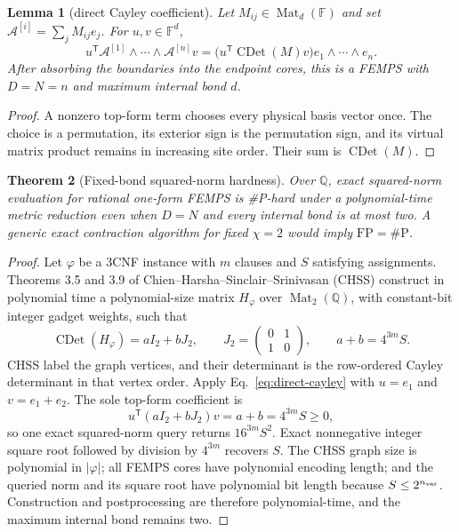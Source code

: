 \documentclass[11pt]{article}
\newtheorem{theorem}{Theorem}[section]
\newtheorem{lemma}[theorem]{Lemma}
\theoremstyle{definition}
\newcommand{\Mat}{\operatorname{Mat}}
\newcommand{\CDet}{\operatorname{CDet}}
\begin{document}
\begin{lemma}[direct Cayley coefficient]
Let $M_{ij}\in\Mat_d(\mathbb F)$ and set
$\mathcal A^{[i]}=\sum_jM_{ij}e_j$.  For $u,v\in\mathbb F^d$,
\[
 u^{\mathsf T}\mathcal A^{[1]}\wedge\cdots\wedge
 \mathcal A^{[n]}v
 =\bigl(u^{\mathsf T}\CDet(M)v\bigr)
 e_1\wedge\cdots\wedge e_n.
 \label{eq:direct-cayley}
\]
After absorbing the boundaries into the endpoint cores, this is a FEMPS with
$D=N=n$ and maximum internal bond $d$.
\end{lemma}

\begin{proof}
A nonzero top-form term chooses every physical basis vector once.  The choice
is a permutation, its exterior sign is the permutation sign, and its virtual
matrix product remains in increasing site order.  Their sum is $\CDet(M)$.
\end{proof}

\begin{theorem}[Fixed-bond squared-norm hardness]
Over $\mathbb Q$, exact squared-norm evaluation for rational one-form FEMPS is
\#P-hard under a polynomial-time metric reduction even when $D=N$ and every
internal bond is at most two.  A generic exact contraction algorithm for fixed
$\chi=2$ would imply $\mathrm{FP}=\#\mathrm P$.
\label{thm:c1}
\end{theorem}

\begin{proof}
Let $\varphi$ be a 3CNF instance with $m$ clauses and $S$ satisfying
assignments.  Theorems 3.5 and 3.9 of
Chien--Harsha--Sinclair--Srinivasan (CHSS) construct in polynomial time a
polynomial-size matrix $H_\varphi$ over $\Mat_2(\mathbb Q)$, with constant-bit
integer gadget weights, such that
\[
 \CDet(H_\varphi)=aI_2+bJ_2,\qquad
 J_2=\begin{pmatrix}0&1\\1&0\end{pmatrix},\qquad
 a+b=4^{3m}S.
\]
CHSS label the graph vertices, and their determinant is the row-ordered Cayley
determinant in that vertex order.  Apply Eq.~\eqref{eq:direct-cayley} with
$u=e_1$ and $v=e_1+e_2$.  The sole top-form coefficient is
\[
 u^{\mathsf T}(aI_2+bJ_2)v=a+b=4^{3m}S\ge0,
\]
so one exact squared-norm query returns $16^{3m}S^2$.  Exact nonnegative
integer square root followed by division by $4^{3m}$ recovers $S$.  The CHSS
graph size is polynomial in $|\varphi|$; all FEMPS cores have polynomial
encoding length; and the queried norm and its square root have polynomial bit
length because $S\le2^{n_{\rm var}}$.  Construction and postprocessing are
therefore polynomial-time, and the maximum internal bond remains two.
\end{proof}
\end{document}
